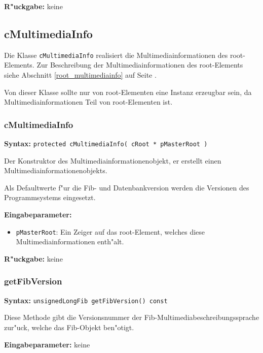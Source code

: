 \bigskip\noindent
\textbf{R"uckgabe:} keine



\subsection{cMultimediaInfo}

Die Klasse \verb|cMultimediaInfo| realisiert die Multimediainformationen des root-Elements.
Zur Beschreibung der Multimediainformationen des root-Elements siehe Abschnitt \ref{root_multimediainfo} auf Seite \pageref{root_multimediainfo} .

Von dieser Klasse sollte nur von root-Elementen eine Instanz erzeugbar sein, da Multimediainformationen Teil von root-Elementen ist.

\subsubsection{cMultimediaInfo}

\textbf{Syntax:} \verb|protected cMultimediaInfo( cRoot * pMasterRoot )|

\bigskip\noindent
Der Konstruktor des Multimediainformationenobjekt, er erstellt einen Multimediainformationenobjekts.

Als Defaultwerte f"ur die Fib- und Datenbankversion werden die Versionen des Programmsystems eingesetzt.

\bigskip\noindent
\textbf{Eingabeparameter:} 
\begin{itemize}
 \item \verb|pMasterRoot|: Ein Zeiger auf das root-Element, welches diese Multimediainformationen enth"alt.
\end{itemize}

\bigskip\noindent
\textbf{R"uckgabe:} keine


\subsubsection{getFibVersion}

\textbf{Syntax:} \verb|unsignedLongFib getFibVersion() const|

\bigskip\noindent
Diese Methode gibt die Versionsnummer der Fib-Mul\-ti\-media\-be\-schrei\-bungs\-sprache zur"uck, welche das Fib-Objekt ben"otigt.

\bigskip\noindent
\textbf{Eingabeparameter:} keine

